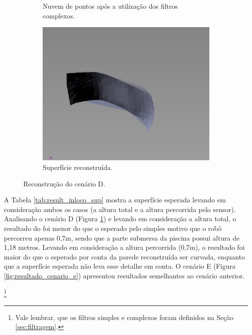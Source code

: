 \begin{figure}[H]
\begin{subfigure}[t]{0.327\textwidth}
        \caption{Nuvem de pontos após a utilização dos filtros complexos.}
    \end{subfigure}
    \begin{subfigure}[t]{0.327\textwidth}
        \includegraphics[width=\textwidth]{dados/figuras/perto_surface.png}
        \caption{Superfície reconstruída.}
    \end{subfigure}
    \caption{Reconstrução do cenário D.}
    \label{fig:resultado_cenario_d}
\end{figure}

A Tabela \ref{tab:result_inloco_sup} mostra a superfície esperada levando em consideração ambos os casos (a altura total e a altura percorrida pelo sensor).
Analisando o cenário D (Figura \ref{fig:resultado_cenario_d}) e levando em consideração a altura total, o resultado do foi menor do que o esperado pelo simples motivo que o robô percorreu apenas 0,7m, sendo que a parte submersa da piscina possui altura de 1,18 metros.
Levando em consideração a altura percorrida (0,7m), o resultado foi maior do que o esperado por conta da parede reconstruída ser curvada, enquanto que a superfície esperada não leva esse detalhe em conta.
O cenário E (Figura \ref{fig:resultado_cenario_e}) apresentou resultados semelhantes ao cenário anterior.

\let\thefootnote\relax\footnote{Vale lembrar, que os filtros simples e complexos foram definidos na Seção \ref{sec:filtragem}.}

